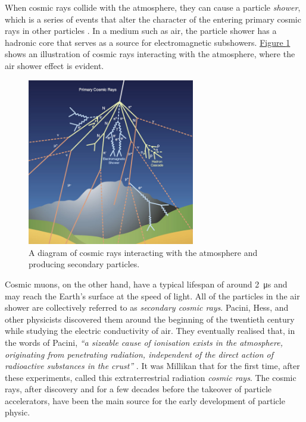 \par
When cosmic rays collide with the atmosphere, they can cause a particle \textit{shower}, which is a series of events that alter the character of the entering primary cosmic rays in other particles \cite{bonomi_2020_applications}. In a medium such as air, the particle shower has a hadronic core that serves as a source for electromagnetic subshowers. \hyperref[figCosmicRay]{Figure \ref{figCosmicRay}} shows an illustration of cosmic rays interacting with the atmosphere, where the air shower effect is evident.

\begin{figure}[h!]
    \centering
    \includegraphics[width=0.65\textwidth]{Images/chap3/cosmic_ray.jpg}
    \caption{A diagram of cosmic rays interacting with the atmosphere and producing secondary particles. \cite{marzena_2017_cms}}
    \label{figCosmicRay}
\end{figure}

\par
Cosmic muons, on the other hand, have a typical lifespan of around \SI{2}{\micro\second} and may reach the Earth's surface at the speed of light. All of the particles in the air shower are collectively referred to as \textit{secondary cosmic rays}. Pacini, Hess, and other physicists discovered them around the beginning of the twentieth century while studying the electric conductivity of air. They eventually realised that, in the words of Pacini, \textit{``a sizeable cause of ionisation exists in the atmosphere, originating from penetrating radiation, independent of the direct action of radioactive substances in the crust''} \cite{deangelis_2012_domenico, alessandrodeangelis_2012_lenigma}. It was Millikan that for the first time, after these experiments, called this extraterrestrial radiation \textit{cosmic rays}.  The cosmic rays, after discovery and for a few decades before the takeover of particle accelerators, have been the main source for the early development of particle physic.

